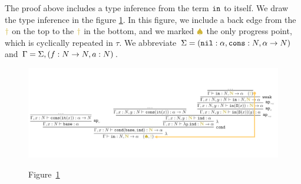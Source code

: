 \documentclass{article}
\begin{document}
The proof above includes a type inference from the term ${\tt in}$ to itself.
We draw the type inference in the figure \ref{figure-term-interval}. 
In this figure, we include a back edge from the 
$\bfColor{oldgold}{\dagger}$ on the top to the $\bfColor{oldgold}{\dagger}$ in the bottom,
and we marked $\bfColor{oldgold}{ \spadesuit}$ the only progress point, which is cyclically repeated
in $\tau$.
We abbreviate 
$\Sigma = ({\tt nil}:\alpha, {\tt cons}:{N},\alpha \rightarrow {N})$
and
$\Gamma = \Sigma,(f:{N} \rightarrow {N}, a:{N})$.

\begin{figure}
\label{figure-term-interval}
\includegraphics[scale=0.6]{type-inference-term-interval.PNG}
\begin{center}\mbox{Figure \ref{figure-term-interval}}\end{center}
\end{figure}
%  
\end{document}
